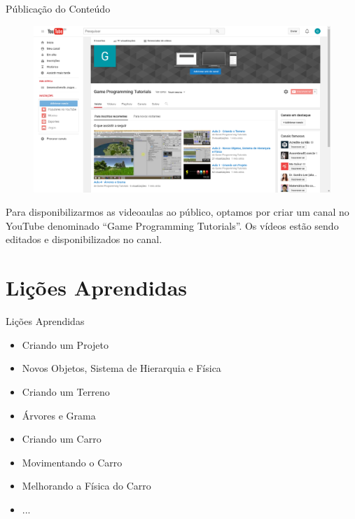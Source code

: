 \documentclass[10pt]{beamer}
\begin{document}
\begin{frame}{Públicação do Conteúdo}

\begin{figure}[H]
		\centering
		\begin{minipage}[b]{0.7\textwidth}
		\includegraphics[width=\textwidth]{figuras/publicacao.png}
		\end{minipage}
\end{figure}


Para disponibilizarmos as videoaulas ao público, optamos por criar um canal no YouTube denominado “Game Programming Tutorials”.
Os vídeos estão sendo editados e disponibilizados no canal.

\end{frame}

\section{Lições Aprendidas}

\begin{frame}{Lições Aprendidas}

\begin{itemize}
		\item Criando um Projeto
		\item Novos Objetos, Sistema de Hierarquia e Física
		\item Criando um Terreno
		\item Árvores e Grama
		\item Criando um Carro
		\item Movimentando o Carro
		\item Melhorando a Física do Carro
		\item ...
\end{itemize}


\end{frame}
\end{document}

